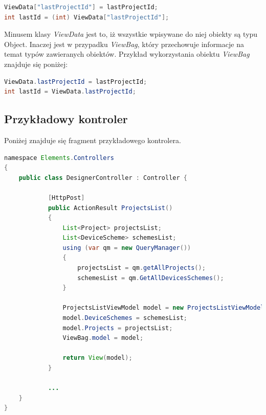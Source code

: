 \begin{lstlisting}[language=Java]
ViewData["lastProjectId"] = lastProjectId;
int lastId = (int) ViewData["lastProjectId"];
\end{lstlisting}
Minusem klasy \textit{ViewData} jest to, iż wszystkie wpisywane do niej obiekty są typu Object.
Inaczej jest w przypadku \textit{ViewBag}, który przechowuje informacje na temat typów zawieranych obiektów. Przykład wykorzystania obiektu \textit{ViewBag} znajduje się poniżej:
\begin{lstlisting}[language=Java]
ViewData.lastProjectId = lastProjectId;
int lastId = ViewData.lastProjectId;
\end{lstlisting}

\subsection{Przykładowy kontroler}
Poniżej znajduje się fragment przykładowego kontrolera.


\begin{lstlisting}[language=Java]
namespace Elements.Controllers
{
    public class DesignerController : Controller {
    
            [HttpPost]
            public ActionResult ProjectsList()
            {
                List<Project> projectsList;
                List<DeviceScheme> schemesList;
                using (var qm = new QueryManager())
                {
                    projectsList = qm.getAllProjects();
                    schemesList = qm.GetAllDevicesSchemes();
                }
                
                ProjectsListViewModel model = new ProjectsListViewModel();
                model.DeviceSchemes = schemesList;
                model.Projects = projectsList;
    			ViewBag.model = model;
    			
                return View(model);
            }
            
            ...     
    }
}
\end{lstlisting}


